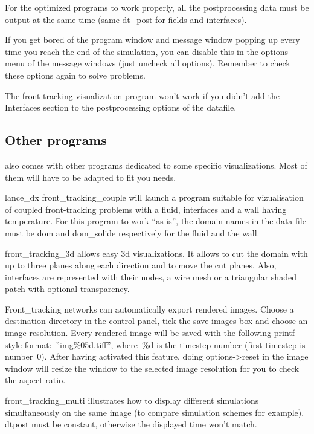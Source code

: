 \documentclass[a4paper,10pt,dvips]{article}
\begin{document}
For the optimized \opendx programs to work properly, all the postprocessing data
must be output at the same time (same \textsf{dt\_post} for fields and interfaces).

If you get bored of the program window and message window popping up every time
you reach the end of the simulation, you can disable this in the options menu
of the message windows (just uncheck all options). Remember to check these
options again to solve problems.

The front tracking visualization program won't work if you didn't add the
\textsf{Interfaces} section to the postprocessing options of the \triou
datafile.

\subsection{Other programs}

\triou also comes with other programs dedicated to some specific visualizations.
Most of them will have to be adapted to fit you needs.

\textsf{lance\_dx front\_tracking\_couple} will launch a program suitable
for vizualisation of coupled front-tracking problems with a fluid,
interfaces and a wall having temperature. For this program to work
``as is'', the domain names in the \triou data file must be
\textsf{dom} and \textsf{dom\_solide} respectively for the fluid and
the wall.

\textsf{front\_tracking\_3d} allows easy 3d visualizations. It allows to
cut the domain with up to three planes along each direction and to
move the cut planes. Also, interfaces are represented with their
nodes, a wire mesh or a triangular shaded patch with optional
transparency.

Front\_tracking networks can automatically export rendered images.
Choose a destination directory in the control panel, tick the
\textsf{save images} box and choose an image resolution.  Every
rendered image will be saved with the following printf style
format:~\textsf{''img\%05d.tiff''}, where~\%d is the timestep number
(first timestep is number~0). After having activated this feature,
doing \textsf{options->reset} in the image window will resize the
window to the selected image resolution for you to check the aspect
ratio.

\textsf{front\_tracking\_multi} illustrates how to display different simulations
simultaneously on the same image (to compare simulation schemes for example).
\textsf{dtpost} must be constant, otherwise the displayed time won't match.
\end{document}

